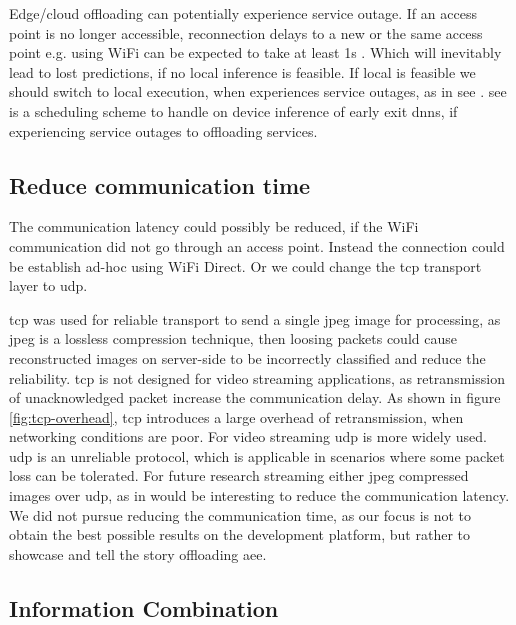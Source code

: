 Edge/cloud offloading can potentially experience service outage. If an access point is no longer accessible, reconnection delays to a new or the same access point e.g. using WiFi can be expected to take at least 1s \cite{pei_why_2017}. Which will inevitably lead to lost predictions, if no local inference is feasible. If local is feasible we should switch to local execution, when experiences service outages, as in \gls{see} \cite{wang_see:_2019}. \gls{see} is a scheduling scheme to handle on device inference of early exit \gls{dnn}s, if experiencing service outages to offloading services.

\subsection*{Reduce communication time}

The communication latency could possibly be reduced, if the WiFi communication did not go through an access point. Instead the connection could be establish ad-hoc using WiFi Direct. Or we could change the \gls{tcp} transport layer to \gls{udp}.

\gls{tcp} was used for reliable transport to send a single jpeg image for processing, as jpeg is a lossless compression technique, then loosing packets could cause reconstructed images on server-side to be incorrectly classified and reduce the reliability. \gls{tcp} is not designed for video streaming applications, as retransmission of unacknowledged packet increase the communication delay. As shown in figure \ref{fig:tcp-overhead}, \gls{tcp} introduces a large overhead of retransmission, when networking conditions are poor. For video streaming \gls{udp} is more widely used. \gls{udp} is an unreliable protocol, which is applicable in scenarios where some packet loss can be tolerated. For future research streaming either jpeg compressed images over \gls{udp}, as in \cite{liu_maximizing_2019} would be interesting to reduce the communication latency. We did not pursue reducing the communication time, as our focus is not to obtain the best possible results on the development platform, but rather to showcase and tell the story offloading \gls{aee}.

\subsection*{Information Combination} 


